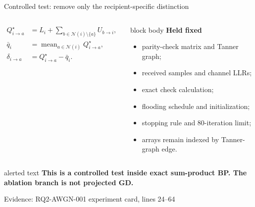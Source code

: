 \documentclass[aspectratio=169,9pt,t]{beamer}
\newcommand{\evidence}[1]{%
  \vfill\hfill{\fontsize{5.8}{6.8}\selectfont\color{Muted}Evidence: #1}}
\newcommand{\scopebox}[1]{%
  \begin{beamercolorbox}[rounded=true,sep=1.3ex]{block body}
    \small #1
  \end{beamercolorbox}}
\begin{document}
\begin{frame}{Controlled test: remove only the recipient-specific distinction}
  \begin{columns}[T,onlytextwidth]
    \begin{align*}
      Q^{\star}_{i\to a}
        &=L_i+\sum_{b\in\mathcal N(i)\setminus\{a\}}U_{b\to i},\\
      \bar q_i
        &=\operatorname{mean}_{a\in\mathcal N(i)}Q^{\star}_{i\to a},\\
      \delta_{i\to a}
        &=Q^{\star}_{i\to a}-\bar q_i.
    \end{align*}


    \scopebox{\textbf{Held fixed}
      \begin{itemize}
        \item parity-check matrix and Tanner graph;
        \item received samples and channel LLRs;
        \item exact check calculation;
        \item flooding schedule and initialization;
        \item stopping rule and 80-iteration limit;
        \item arrays remain indexed by Tanner-graph edge.
      \end{itemize}}
  \end{columns}

  \vspace{1mm}
  \begin{beamercolorbox}[rounded=true,sep=1.2ex]{alerted text}
    \centering\bfseries This is a controlled test inside exact sum-product BP. The ablation branch is not projected GD.
  \end{beamercolorbox}
  \evidence{RQ2-AWGN-001 experiment card, lines 24--64}
\end{frame}
\end{document}
